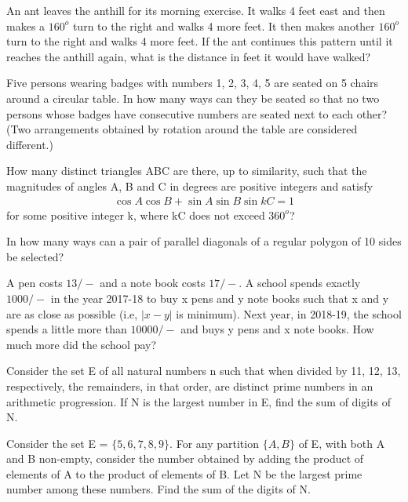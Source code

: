 \item An ant leaves the anthill for its morning exercise. It walks 4 feet east and then makes a $160^{o}$ turn to the right and walks 4 more feet. It then makes another $160^{o}$  turn to the right and walks 4 more feet. If the ant continues this pattern until it reaches the anthill again, what is the distance in feet it would have walked?

\item Five persons wearing badges with numbers 1, 2, 3, 4, 5 are seated on 5 chairs around a circular table. In how many ways can they be seated so that no two persons whose badges have consecutive numbers are seated next to each other? 
(Two arrangements obtained by rotation around the table are considered different.)

\item How many distinct triangles ABC are there, up to similarity, such that the magnitudes of angles A, B and C in degrees are positive integers and satisfy
\begin{align*}
\cos A \cos B + \sin A \sin B \sin kC = 1
\end{align*}
for some positive integer k, where kC does not exceed $360^{o}$?

\item  In how many ways can a pair of parallel diagonals of a regular polygon of 10 sides be selected?

\item A pen costs $13/-$ and a note book costs $17/-$. A school spends exactly $1000/-$ in the year 2017-18 to buy x pens and y note books such that x and y are as close as possible (i.e, $|x - y|$ is minimum). Next year, in 2018-19, the school spends a little more than $10000/-$ and buys y pens and x note books. How much more did the school pay?

\item Consider the set E of all natural numbers n such that when divided by 11, 12, 13, respectively, the remainders, in that order, are distinct prime numbers in an arithmetic progression. If N is the largest number in E, find the sum of digits of N.

\item Consider the set E = $\{5, 6, 7, 8, 9\}$. For any partition $\{A, B\}$ of E, with both A and B non-empty, consider the number obtained by adding the product of elements of A to the product of elements of B. Let N be the largest prime number among these numbers. Find the sum of the digits of N.

